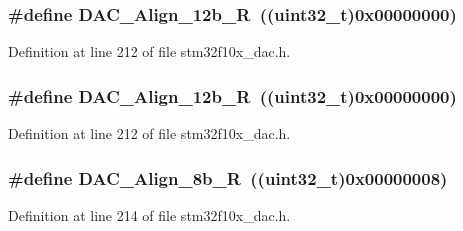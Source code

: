 \subsubsection[{\texorpdfstring{D\+A\+C\+\_\+\+Align\+\_\+12b\+\_\+R}{DAC_Align_12b_R}}]{\setlength{\rightskip}{0pt plus 5cm}\#define D\+A\+C\+\_\+\+Align\+\_\+12b\+\_\+R~(({\bf uint32\+\_\+t})0x00000000)}\hypertarget{group___d_a_c__data__alignment_ga0f2a6fc71aaf90a27b0caf1bd06e73f2}{}\label{group___d_a_c__data__alignment_ga0f2a6fc71aaf90a27b0caf1bd06e73f2}


Definition at line 212 of file stm32f10x\+\_\+dac.\+h.

\subsubsection[{\texorpdfstring{D\+A\+C\+\_\+\+Align\+\_\+12b\+\_\+R}{DAC_Align_12b_R}}]{\setlength{\rightskip}{0pt plus 5cm}\#define D\+A\+C\+\_\+\+Align\+\_\+12b\+\_\+R~(({\bf uint32\+\_\+t})0x00000000)}\hypertarget{group___d_a_c__data__alignment_ga0f2a6fc71aaf90a27b0caf1bd06e73f2}{}\label{group___d_a_c__data__alignment_ga0f2a6fc71aaf90a27b0caf1bd06e73f2}


Definition at line 212 of file stm32f10x\+\_\+dac.\+h.

\subsubsection[{\texorpdfstring{D\+A\+C\+\_\+\+Align\+\_\+8b\+\_\+R}{DAC_Align_8b_R}}]{\setlength{\rightskip}{0pt plus 5cm}\#define D\+A\+C\+\_\+\+Align\+\_\+8b\+\_\+R~(({\bf uint32\+\_\+t})0x00000008)}\hypertarget{group___d_a_c__data__alignment_gaa633fbcf85e97e12c4894eaed530dd8f}{}\label{group___d_a_c__data__alignment_gaa633fbcf85e97e12c4894eaed530dd8f}


Definition at line 214 of file stm32f10x\+\_\+dac.\+h.

